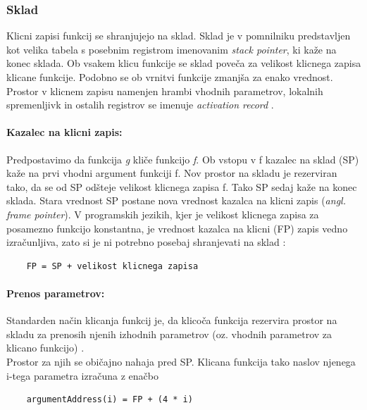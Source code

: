 \documentclass[a4paper, 12p]{book}
\begin{document}
\subsubsection{Sklad}

Klicni zapisi funkcij se shranjujejo na sklad. Sklad je v pomnilniku predstavljen kot velika tabela s posebnim registrom imenovanim \textit{stack pointer}, ki kaže na konec sklada. Ob vsakem klicu funkcije se sklad poveča za velikost klicnega zapisa klicane funkcije. Podobno se ob vrnitvi funkcije zmanjša za enako vrednost. Prostor v klicnem zapisu namenjen hrambi vhodnih parametrov, lokalnih spremenljivk in ostalih registrov se imenuje \textit{activation record} \cite{modernCompiler}. 

\paragraph{Kazalec na klicni zapis:}

Predpostavimo da funkcija \textit{g} kliče funkcijo \textit{f}. Ob vstopu v f kazalec na sklad (SP) kaže na prvi vhodni argument funkciji f. Nov prostor na skladu je rezerviran tako, da se od SP odšteje velikost klicnega zapisa f. Tako SP sedaj kaže na konec sklada. Stara vrednost SP postane nova vrednost kazalca na klicni zapis (\textit{angl. frame pointer}). V programskih jezikih, kjer je velikost klicnega zapisa za posamezno funkcijo konstantna, je vrednost kazalca na klicni (FP) zapis vedno izračunljiva, zato si je ni potrebno posebaj shranjevati na sklad \cite{modernCompiler}: 

\begin{lstlisting}
	FP = SP + velikost klicnega zapisa
\end{lstlisting}

\paragraph{Prenos parametrov:}

Standarden način klicanja funkcij je, da klicoča funkcija rezervira prostor na skladu za prenosih njenih izhodnih parametrov (oz. vhodnih parametrov za klicano funkcijo) \cite{modernCompiler}. \\ 
\indent Prostor za njih se običajno nahaja pred SP. Klicana funkcija tako naslov njenega i-tega parametra izračuna z enačbo 
\begin{lstlisting}
	argumentAddress(i) = FP + (4 * i)
\end{lstlisting}
\end{document}
